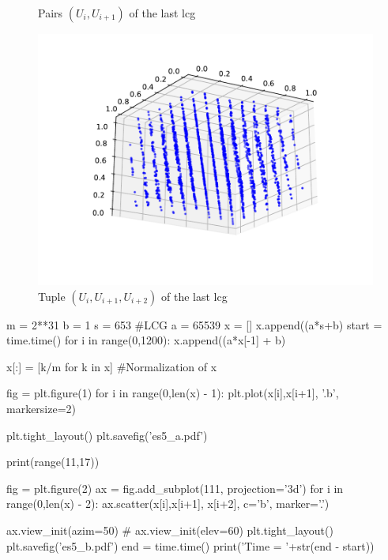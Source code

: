 \documentclass[11pt,a4paper]{article}
\begin{document}
\begin{figure}[ht]
	\centering
	\begin{minipage}{0.45\textwidth}
		\centering
		\caption{Pairs $(U_i, U_{i+1})$ of the last \gls{lcg}}
		\label{fig:es5_a}
	\end{minipage}
	\begin{minipage}{0.45\textwidth}
		\centering
		\includegraphics[width=\textwidth]{es5_b}
		\caption{Tuple $(U_i, U_{i+1}, U_{i+2})$ of the last \gls{lcg}}
    \label{fig:es5_b}
	\end{minipage}
\end{figure}

\begin{python}
  m = 2**31
  b = 1
  s = 653
  #LCG
  a = 65539
  x = []
  x.append((a*s+b)%
  start = time.time()
  for i in range(0,1200):
    x.append((a*x[-1] + b)%

  x[:] = [k/m for k in x] #Normalization of x

  fig = plt.figure(1)
  for i in range(0,len(x) - 1):
    plt.plot(x[i],x[i+1], '.b', markersize=2)

  plt.tight_layout()
  plt.savefig('es5_a.pdf')

  print(range(11,17))

  fig = plt.figure(2)
  ax = fig.add_subplot(111, projection='3d')
  for i in range(0,len(x) - 2):
    ax.scatter(x[i],x[i+1], x[i+2], c='b', marker='.')

  ax.view_init(azim=50)
  # ax.view_init(elev=60)
  plt.tight_layout()
  plt.savefig('es5_b.pdf')
  end = time.time()
  print('Time = '+str(end - start))
\end{python}
\end{document}
